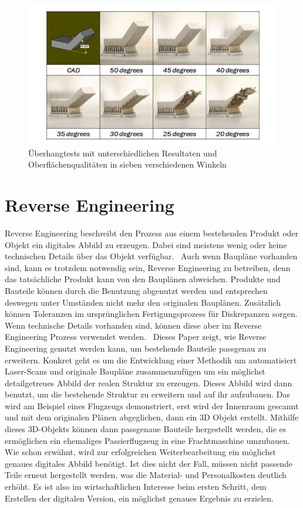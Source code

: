 \begin{figure}[H]
    \centering
    \includegraphics[width=0.9\linewidth]{images/Overhang-tests-showing-different-printabilities-and-finish-qualities-at-seven-different.jpg}
    \caption{Überhangtests mit unterschiedlichen Resultaten und 
    Oberflächenqualitäten in sieben verschiedenen Winkeln \cite{Meng.2020}}
    \label{fig:overhang}
\end{figure}

\section{Reverse Engineering}

Reverse Engineering beschreibt den Prozess aus einem bestehenden Produkt 
oder Objekt ein digitales Abbild zu erzeugen.
Dabei sind meistens wenig oder keine technischen Details über das Objekt
verfügbar.~\cite{Helle.2021}  
Auch wenn Baupläne vorhanden sind, kann es trotzdem notwendig sein, 
Reverse Engineering zu betreiben, denn das tatsächliche Produkt kann von
den Bauplänen abweichen. Produkte und Bauteile können durch die Benutzung 
abgenutzt werden und entsprechen deswegen unter Umständen nicht mehr den originalen 
Bauplänen. Zusätzlich können Toleranzen im ursprünglichen Fertigungsprozess 
für Diskrepanzen sorgen. Wenn technische Details vorhanden sind,
können diese aber im Reverse Engineering Prozess verwendet werden.\ \cite{Monchinger.2021} 
Dieses Paper zeigt, wie Reverse Engineering genutzt werden kann, um 
bestehende Bauteile passgenau zu erweitern. Konkret geht es um die
Entwicklung einer Methodik um automatisiert Laser-Scans und originale Baupläne
zusammenzufügen um ein möglichst detailgetreues Abbild der realen Struktur zu
erzeugen. Dieses Abbild wird dann benutzt, um die bestehende Struktur zu 
erweitern und auf ihr aufzubauen. Das wird am Beispiel eines Flugzeugs 
demonstriert, erst wird der Innenraum gescannt und mit dem originalen Plänen
abgeglichen, dann ein 3D Objekt erstellt. Mithilfe dieses 3D-Objekts können 
dann passgenaue Bauteile hergestellt werden, die es ermöglichen ein ehemaliges 
Passierflugzeug in eine Frachtmaschine umzubauen.
Wie schon erwähnt, wird zur erfolgreichen Weiterbearbeitung ein möglichst 
genaues digitales Abbild benötigt.
Ist dies nicht der Fall, müssen nicht passende Teile erneut hergestellt werden, 
was die Material- und Personalkosten deutlich erhöht. Es ist also im 
wirtschaftlichen Interesse beim ersten Schritt, dem Erstellen der digitalen 
Version, ein möglichst genaues Ergebnis zu erzielen. 

